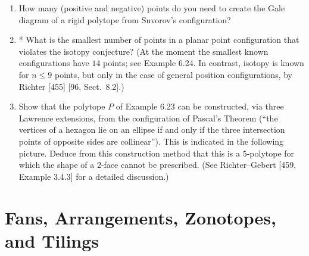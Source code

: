 \documentclass{article}
\begin{document}
\begin{enumerate}
\item How many (positive and negative) points do you need to create the Gale diagram of a rigid polytope from Suvorov's configuration?

\item* What is the smallest number of points in a planar point configuration that violates the isotopy conjecture? (At the moment the smallest known configurations have $14$ points; see Example 6.24. In contrast, isotopy is known for $n\le 9$ points, but only in the case of general position configurations, by Richter [455] [96, Sect.\ 8.2].)

\item Show that the polytope $P$ of Example 6.23 can be constructed, via three Lawrence extensions, from the configuration of Pascal's Theorem (``the vertices of a hexagon lie on an ellipse if and only if the three intersection points of opposite sides are collinear''). This is indicated in the following picture. Deduce from this construction method that this is a $5$-polytope for which the shape of a $2$-face cannot be prescribed. (See Richter--Gebert [459, Example 3.4.3] for a detailed discussion.)


\end{enumerate}

\bigskip
\section{Fans, Arrangements, Zonotopes, and Tilings}
\end{document}
